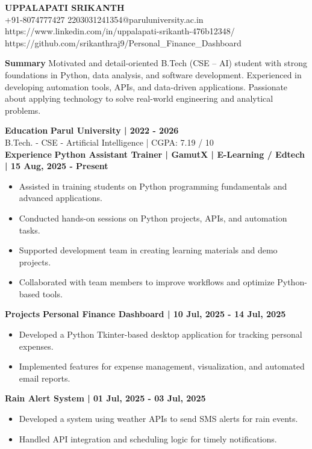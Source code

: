 \documentclass[10pt]{article}
\begin{document}
\begin{center}
    {\LARGE \textbf{UPPALAPATI SRIKANTH}} \\
    +91-8074777427 \textbar{} 2203031241354@paruluniversity.ac.in \textbar{} https://www.linkedin.com/in/uppalapati-srikanth-476b12348/ \textbar{} https://github.com/srikanthraj9/Personal\_Finance\_Dashboard
\end{center}

\textbf{Summary}
Motivated and detail-oriented B.Tech (CSE – AI) student with strong foundations in Python, data analysis, and software development. Experienced in developing automation tools, APIs, and data-driven applications. Passionate about applying technology to solve real-world engineering and analytical problems.

\textbf{Education}
\textbf{Parul University | 2022 - 2026}\\
B.Tech. - CSE - Artificial Intelligence | CGPA: 7.19 / 10\\

\textbf{Experience}
\textbf{Python Assistant Trainer | GamutX | E-Learning / Edtech | 15 Aug, 2025 - Present}
\begin{itemize}
\item Assisted in training students on Python programming fundamentals and advanced applications.
\item Conducted hands-on sessions on Python projects, APIs, and automation tasks.
\item Supported development team in creating learning materials and demo projects.
\item Collaborated with team members to improve workflows and optimize Python-based tools.
\end{itemize}

\textbf{Projects}
\textbf{Personal Finance Dashboard | 10 Jul, 2025 - 14 Jul, 2025}
\begin{itemize}
\item Developed a Python Tkinter-based desktop application for tracking personal expenses.
\item Implemented features for expense management, visualization, and automated email reports.
\end{itemize}

\textbf{Rain Alert System | 01 Jul, 2025 - 03 Jul, 2025}
\begin{itemize}
\item Developed a system using weather APIs to send SMS alerts for rain events.
\item Handled API integration and scheduling logic for timely notifications.
\end{itemize}
\end{document}
